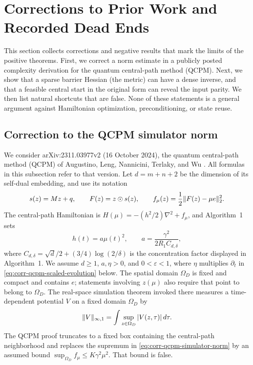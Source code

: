 \section{Corrections to Prior Work and Recorded Dead Ends}
\label{sec:corrections}

This section collects corrections and negative results that mark the limits
of the positive theorems.  First, we correct a norm estimate in a publicly
posted complexity derivation for the quantum central-path method (QCPM).
Next, we show that a sparse barrier Hessian (the metric) can have a dense
inverse, and that a feasible central start in the original form can reveal
the input parity.  We then list natural shortcuts that are false.
None of these statements is a general argument against Hamiltonian
optimization, preconditioning, or state reuse.

\subsection{Correction to the QCPM simulator norm}
\label{sec:corrections-qcpm}

We consider arXiv:2311.03977v2 (16 October 2024), the quantum central-path
method (QCPM) of Augustino, Leng, Nannicini, Terlaky, and Wu
\cite{augustino2024-quantum-central-path-algorithm-linear}.  All formulas in
this subsection refer to that version.  Let $d=m+n+2$ be the dimension of its
self-dual embedding, and use its notation
\begin{equation}
 s(z)=Mz+q,\qquad F(z)=z\odot s(z),\qquad
 f_\mu(z)=\frac12\lVert F(z)-\mu e\rVert_2^2.                 \label{eq:corr-qcpm-potential}
\end{equation}
The central-path Hamiltonian is
$H(\mu)=-(h^2/2)\nabla^2+f_\mu$, and Algorithm~1 sets
\begin{equation}
 h(t)=a\mu(t)^2,
 \qquad a=\frac{\gamma^2}{2R_1C_{d,\delta}},            \label{eq:corr-qcpm-h}
\end{equation}
where $C_{d,\delta}=\sqrt d/2+(3/4)\log(2/\delta)$ is the
concentration factor displayed in Algorithm~1.  We assume $d\geq1$,
$a,\eta>0$, and $0<\varepsilon<1$, where $\eta$ multiplies $\partial_t$
in \eqref{eq:corr-qcpm-scaled-evolution} below.  The spatial domain $\Omega_D$ is
fixed and compact and contains $e$; statements involving $z(\mu)$ also
require that point to belong to $\Omega_D$.  The real-space simulation
theorem invoked there measures a time-dependent potential $V$ on a fixed
domain $\Omega_D$ by
\begin{equation}
 \lVert V\rVert_{\infty,1}=\int\sup_{z\in\Omega_D}|V(z,\tau)|\,d\tau.             \label{eq:corr-qcpm-simulator-norm}
\end{equation}
The QCPM proof truncates to a fixed box containing the central-path
neighborhood and replaces the supremum in
\eqref{eq:corr-qcpm-simulator-norm} by an assumed bound
$\sup_{\Omega_D} f_\mu\leq K\gamma^2\mu^2$.  That bound is false.

